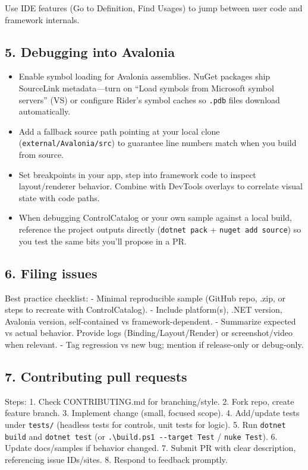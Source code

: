Use IDE features (Go to Definition, Find Usages) to jump between user
code and framework internals.

\subsection{5. Debugging into Avalonia}\label{debugging-into-avalonia}

\begin{itemize}
\tightlist
\item
  Enable symbol loading for Avalonia assemblies. NuGet packages ship
  SourceLink metadata---turn on ``Load symbols from Microsoft symbol
  servers'' (VS) or configure Rider's symbol caches so
  \passthrough{\lstinline!.pdb!} files download automatically.
\item
  Add a fallback source path pointing at your local clone
  (\passthrough{\lstinline!external/Avalonia/src!}) to guarantee line
  numbers match when you build from source.
\item
  Set breakpoints in your app, step into framework code to inspect
  layout/renderer behavior. Combine with DevTools overlays to correlate
  visual state with code paths.
\item
  When debugging ControlCatalog or your own sample against a local
  build, reference the project outputs directly
  (\passthrough{\lstinline!dotnet pack!} +
  \passthrough{\lstinline!nuget add source!}) so you test the same bits
  you'll propose in a PR.
\end{itemize}

\subsection{6. Filing issues}\label{filing-issues}

Best practice checklist: - Minimal reproducible sample (GitHub repo,
.zip, or steps to recreate with ControlCatalog). - Include platform(s),
.NET version, Avalonia version, self-contained vs framework-dependent. -
Summarize expected vs actual behavior. Provide logs
(Binding/Layout/Render) or screenshot/video when relevant. - Tag
regression vs new bug; mention if release-only or debug-only.

\subsection{7. Contributing pull
requests}\label{contributing-pull-requests}

Steps: 1. Check CONTRIBUTING.md for branching/style. 2. Fork repo,
create feature branch. 3. Implement change (small, focused scope). 4.
Add/update tests under \passthrough{\lstinline!tests/!} (headless tests
for controls, unit tests for logic). 5. Run
\passthrough{\lstinline!dotnet build!} and
\passthrough{\lstinline!dotnet test!} (or
\passthrough{\lstinline!.\\build.ps1 --target Test!} /
\passthrough{\lstinline!nuke Test!}). 6. Update docs/samples if behavior
changed. 7. Submit PR with clear description, referencing issue
IDs/sites. 8. Respond to feedback promptly.

